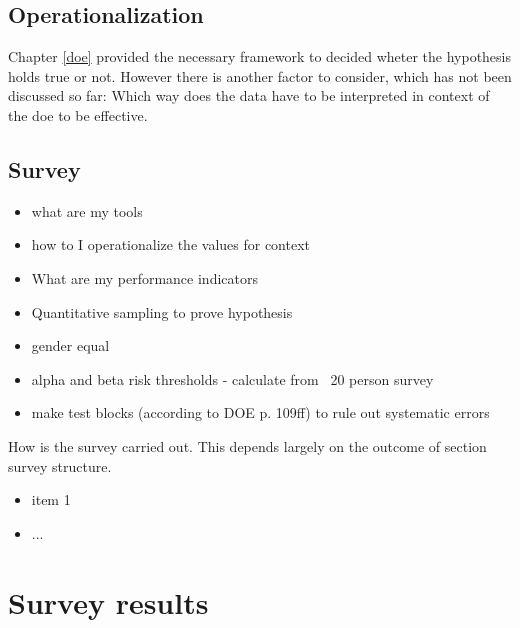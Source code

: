         \section{Operationalization}\label{operationalization}

            Chapter \ref*{doe} provided the necessary framework to decided wheter the hypothesis holds true or not. However there is another factor to consider, which has not been discussed so far: Which way does the data have to be interpreted in context of the doe to be effective. 

            \medskip


        \section{Survey}

            \begin{itemize}
                \item what are my tools
                \item how to I operationalize the values for context
                \item What are my performance indicators
                \item Quantitative sampling to prove hypothesis
                \item gender equal
                \item alpha and beta risk thresholds - calculate from ~20 person survey
                \item make test blocks (according to DOE p. 109ff) to rule out systematic errors
            \end{itemize}

            How is the survey carried out. This depends largely on the outcome of section survey structure.

            \begin{itemize}
                \item item 1
                \item ...
            \end{itemize}

    \chapter{Survey results}

